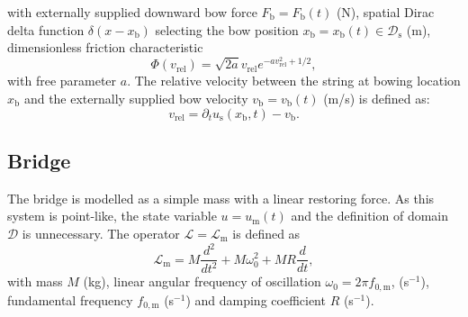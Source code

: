 \documentclass[dvipsnames, pdftex]{article}
\begin{document}
with externally supplied downward bow force $F_\text{b} = F_\text{b}(t)$ (N), spatial Dirac delta function $\delta(x-x_\text{b})$ selecting the bow position $x_\text{b} = x_\text{b}(t)\in \mathcal{D}_\text{s}$ (m), dimensionless friction characteristic
\begin{equation}
    \Phi(v_\text{rel}) = \sqrt{2a}v_\text{rel}e^{-av_\text{rel}^2+1/2},
\end{equation}
with free parameter $a$. The relative velocity between the string at bowing location $x_\text{b}$ and the externally supplied bow velocity $v_\text{b} = v_\text{b}(t)$ (m/s) is defined as:
\begin{equation}
    v_\text{rel} = \partial_tu_\text{s}(x_\text{b},t) - v_\text{b}.
\end{equation}

\subsection{Bridge}
The bridge is modelled as a simple mass with a linear restoring force. As this system is point-like, %
the state variable $u = u_\text{m}(t)$ and the definition of domain $\mathcal{D}$ is unnecessary. The operator $\mathcal{L}=\mathcal{L}_\text{m}$ is defined as
\begin{equation}
    \mathcal{L}_\text{m}=M\frac{d^2}{dt^2}+M\omega_0^2+MR\frac{d}{dt},
\end{equation}
with mass $M$ (kg), linear angular frequency of oscillation $\omega_0=2\pi f_{0,\text{m}}$,  (s$^{-1}$), fundamental frequency $f_{0,\text{m}}$ (s$^{-1}$) and damping coefficient $R$ (s$^{-1}$).
    
    
    
\end{document}
